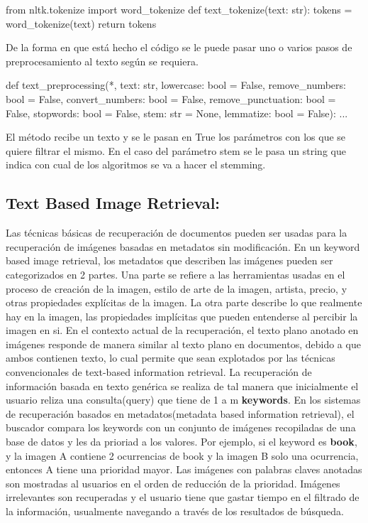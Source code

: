 \documentclass{llncs}
\begin{document}
\begin{python}
from nltk.tokenize import word_tokenize
def text_tokenize(text: str):
    tokens = word_tokenize(text)
    return tokens
\end{python}
\noindent
De la forma en que está hecho el código se le puede pasar uno o varios pasos de preprocesamiento 
al texto según se requiera. 
\\
\begin{python}
def text_preprocessing(*, text: str, 
    lowercase: bool = False, 
    remove_numbers: bool = False,
    convert_numbers: bool = False,
    remove_punctuation: bool = False,
    stopwords: bool = False,
    stem: str = None,
    lemmatize: bool = False):
    ...
\end{python}
El método recibe un texto y se le pasan en True los parámetros con los que
se quiere filtrar el mismo. En el caso del parámetro stem se le pasa un string 
que indica con cual de los algoritmos se va a hacer el stemming. 




\subsection{Text Based Image Retrieval:}

Las t\'ecnicas b\'asicas de recuperaci\'on de documentos pueden ser usadas para la recuperaci\'on
de im\'agenes basadas en metadatos sin modificaci\'on. En un keyword based image
retrieval, los metadatos que describen las im\'agenes pueden ser categorizados en 2
partes. Una parte se refiere a las herramientas usadas en el proceso de creaci\'on de la imagen, estilo
de arte de la imagen, artista, precio, y otras propiedades expl\'icitas de la imagen. La otra parte describe
lo que realmente hay en la imagen, las propiedades impl\'icitas que pueden entenderse al 
percibir la imagen en si. En el contexto actual de la recuperaci\'on, el texto plano anotado en im\'agenes
responde de manera similar al texto plano en documentos, debido a que ambos contienen texto, lo cual permite
que sean explotados por las t\'ecnicas convencionales de text-based information retrieval. La recuperaci\'on de
informaci\'on basada en texto gen\'erica se realiza de tal manera que inicialmente el usuario reliza una
consulta(query) que tiene de 1 a m \textbf{keywords}. En los sistemas de recuperaci\'on basados en 
metadatos(metadata based information retrieval), el buscador compara los keywords con un conjunto de im\'agenes 
recopiladas de una base de datos y les da prioriad a los valores. Por ejemplo, si el keyword es \textbf{book}, y la 
imagen A contiene 2 ocurrencias de book y la imagen B solo una ocurrencia, entonces A tiene una prioridad mayor.  Las 
im\'agenes con palabras claves anotadas son mostradas al usuarios en el orden de reducci\'on de la prioridad. Im\'agenes 
irrelevantes son recuperadas y el usuario tiene que gastar tiempo en el filtrado de la informaci\'on, usualmente navegando
a trav\'es de los resultados de b\'usqueda. 
\end{document}

